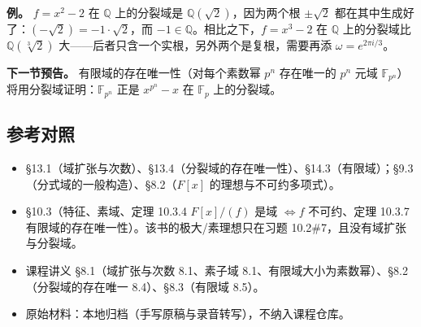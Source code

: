 \textbf{例。} $f=x^2-2$ 在 $\mathbb Q$ 上的分裂域是 $\mathbb Q(\sqrt2)$，因为两个根 $\pm\sqrt2$ 都在其中生成好了：$(-\sqrt2)=-1\cdot\sqrt2$，而 $-1\in\mathbb Q$。相比之下，$f=x^3-2$ 在 $\mathbb Q$ 上的分裂域比 $\mathbb Q(\sqrt[3]{2})$ 大——后者只含一个实根，另外两个是复根，需要再添 $\omega=e^{2\pi i/3}$。

\textbf{下一节预告。} 有限域的存在唯一性（对每个素数幂 $p^n$ 存在唯一的 $p^n$ 元域 $\mathbb F_{p^n}$）将用分裂域证明：$\mathbb F_{p^n}$ 正是 $x^{p^n}-x$ 在 $\mathbb F_p$ 上的分裂域。

\subsection{参考对照}


\begin{itemize}
\item [DF] §13.1（域扩张与次数）、§13.4（分裂域的存在唯一性）、§14.3（有限域）；§9.3（分式域的一般构造）、§8.2（$F[x]$ 的理想与不可约多项式）。
\item [DS] §10.3（特征、素域、定理 10.3.4 $F[x]/(f)$ 是域 $\iff f$ 不可约、定理 10.3.7 有限域的存在唯一性）。该书的极大/素理想只在习题 10.2\#7，且没有域扩张与分裂域。
\item 课程讲义 §8.1（域扩张与次数 8.1、素子域 8.1、有限域大小为素数幂）、§8.2（分裂域的存在唯一 8.4）、§8.3（有限域 8.5）。
\item 原始材料：本地归档（手写原稿与录音转写），不纳入课程仓库。
\end{itemize}
